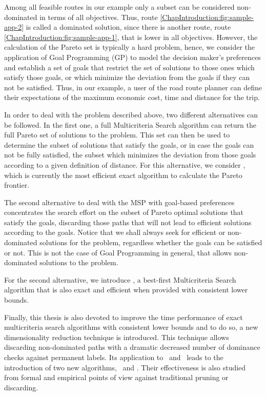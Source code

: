 Among all feasible routes in our example only a subset can be considered non-dominated in terms of all objectives. Thus, route \ref{ChapIntroduction:fig:sample-app-2} is called a dominated solution, since there is another route, route \ref{ChapIntroduction:fig:sample-app-1}, that is lower in all objectives. However, the calculation of the Pareto set is typically a hard problem, hence, we consider the application of Goal Programming (GP) to model the decision maker's preferences and establish a set of goals that  restrict the set of solutions to those ones which satisfy those goals, or which minimize the deviation from the goals if they can not be satisfied. Thus, in our example, a user of the road route planner can define their expectations of the maximum economic cost, time and distance for the trip.

In order to deal with the problem described above, two different alternatives can be followed. In the first one, a full Multicriteria Search algorithm can return the full Pareto set of solutions to the problem. This set can then be used to determine the subset of solutions that satisfy the goals, or in case the goals can not be fully satisfied, the subset which minimizes the deviation from those goals according to a given definition of distance. For this alternative, we consider \namoa, which is currently the most efficient exact algorithm to calculate the Pareto frontier.

The second alternative to deal with the MSP with goal-based preferences concentrates the search effort on the subset of Pareto optimal solutions that satisfy the goals, discarding those paths that will not lead to efficient solutions according to the goals. Notice that we shall always seek for efficient or non-dominated solutions for the problem, regardless whether the goals can be satisfied or not. This is not the case of Goal Programming in general, that allows non-dominated solutions to the problem. 

For the second alternative, we introduce \lexgo, a best-first Multicriteria Search algorithm that is also exact and efficient when provided with consistent lower bounds. 

Finally, this thesis is also devoted to improve the time performance of exact multicriteria search algorithms with consistent lower bounds and to do so, a new dimensionality reduction technique is introduced. This technique allows discarding non-dominated paths with a dramatic decreased number of dominance checks against permanent labels. Its application to \namoa \ and \lexgo \ leads to the introduction of two new algorithms, \namoate \ and \lexgote. Their effectiveness is also studied from formal and empirical points of view against traditional pruning or discarding.  

